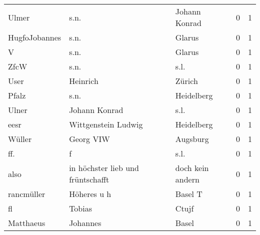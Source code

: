 \begin{tabular}{llllrr}
                    Ulmer &                               s.n. &             &                               Johann Konrad &          0 &         1 \\
            HugfoJobannes &                               s.n. &             &                                      Glarus &          0 &         1 \\
                        V &                               s.n. &             &                                      Glarus &          0 &         1 \\
                     ZfcW &                               s.n. &             &                                        s.l. &          0 &         1 \\
                     User &                           Heinrich &             &                                      Zürich &          0 &         1 \\
                    Pfalz &                               s.n. &             &                                  Heidelberg &          0 &         1 \\
                    Ulner &                      Johann Konrad &             &                                        s.l. &          0 &         1 \\
                     eesr &                Wittgenstein Ludwig &             &                                  Heidelberg &          0 &         1 \\
                   Wüller &                          Georg VIW &             &                                    Augsburg &          0 &         1 \\
                      ff. &                                  f &             &                                        s.l. &          0 &         1 \\
                     also &  in höchster lieb und früntschafft &             &                            doch kein andern &          0 &         1 \\
               rancmüller &                        Höheres u h &             &                                     Basel T &          0 &         1 \\
                       fl &                             Tobias &             &                                       Ctujf &          0 &         1 \\
                Matthaeus &                           Johannes &             &                                       Basel &          0 &         1 \\

\end{tabular}
